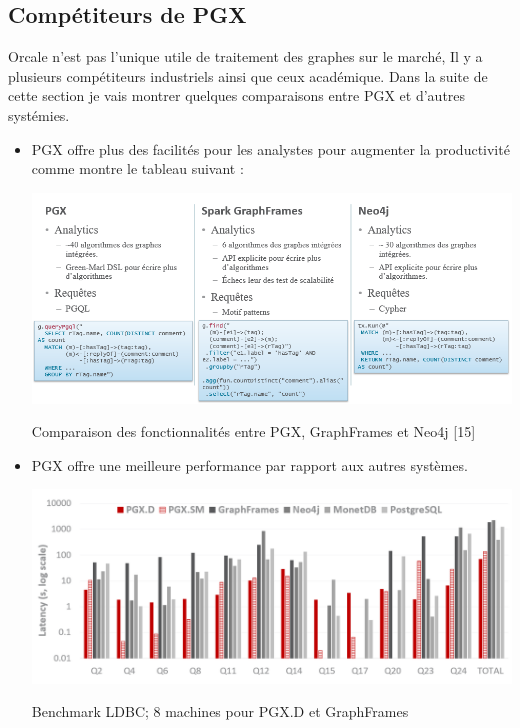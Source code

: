 \subsection{Compétiteurs de PGX}

Orcale n’est pas l’unique utile de traitement des graphes sur le marché, Il y a plusieurs compétiteurs industriels ainsi que ceux académique. Dans la suite de cette section je vais montrer quelques comparaisons entre PGX et d’autres systémies.\\
\begin{itemize}
\item PGX offre plus des facilités pour les analystes pour augmenter la productivité comme montre le tableau suivant :
\begin{table}[h!]  
  \centering
    \includegraphics[width=1.15\textwidth]{chapitre1/Figures/FonctionalitesPGX.png}
  \caption{Comparaison des fonctionnalités entre PGX, GraphFrames et Neo4j [15]}
\end{table}

\item PGX offre une meilleure performance par rapport aux autres systèmes.

\begin{table}[h!]  
  \centering
    \includegraphics[width=1.15\textwidth]{chapitre1/Figures/BenchmarkLDBC.png}
  \caption{Benchmark LDBC; 8 machines pour PGX.D et GraphFrames}
\end{table}
\end{itemize}

